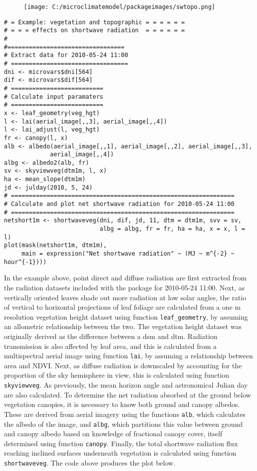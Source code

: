 \documentclass[]{article}
\begin{document}
\begin{figure}
\centering
\texttt{[image: C:/microclimatemodel/packageimages/swtopo.png]}
\caption{}
\end{figure}

\begin{verbatim}
# = Example: vegetation and topographic = = = = = = 
# = = = effects on shortwave radiation  = = = = = =
#
#=================================
# Extract data for 2010-05-24 11:00
# =================================
dni <- microvars$dni[564]
dif <- microvars$dif[564]
# ==========================
# Calculate input paramaters
# ==========================
x <- leaf_geometry(veg_hgt)
l <- lai(aerial_image[,,3], aerial_image[,,4])
l <- lai_adjust(l, veg_hgt)
fr <- canopy(l, x)
alb <- albedo(aerial_image[,,1], aerial_image[,,2], aerial_image[,,3],
             aerial_image[,,4])
albg <- albedo2(alb, fr)
sv <- skyviewveg(dtm1m, l, x)
ha <- mean_slope(dtm1m)
jd <- julday(2010, 5, 24)
# ===============================================================
# Calculate and plot net shortwave radiation for 2010-05-24 11:00
# ===============================================================
netshort1m <- shortwaveveg(dni, dif, jd, 11, dtm = dtm1m, svv = sv, 
                           albg = albg, fr = fr, ha = ha, x = x, l = l)
plot(mask(netshort1m, dtm1m), 
     main = expression("Net shortwave radiation" ~ (MJ ~ m^{-2} ~     hour^{-1})))
\end{verbatim}

In the example above, point direct and diffuse radiation are first
extracted from the radiation datasets included with the package for
2010-05-24 11:00. Next, as vertically oriented leaves shade out more
radiation at low solar angles, the ratio of vertical to horizontal
projections of leaf foliage are calculated from a one m resolution
vegetation height dataset using function \texttt{leaf\_geometry}, by
assuming an allometric relationship between the two. The vegetation
height dataset was originally derived as the difference between a dsm
and dtm. Radiation transmission is also affected by leaf area, and this
is calculated from a multispectral aerial image using function
\texttt{lai}, by assuming a relationship between area and NDVI. Next, as
diffuse radiation is downscaled by accounting for the proportion of the
sky hemisphere in view, this is calculated using function
\texttt{skyviewveg}. As previously, the mean horizon angle and
astronomical Julian day are also calculated. To determine the net
radiation absorbed at the ground below vegetation canopies, it is
necessary to know both ground and canopy albedos. These are derived from
aerial imagery using the functions \texttt{alb}, which calculates the
albedo of the image, and \texttt{albg}, which partitions this value
between ground and canopy albedo based on knowledge of fractional canopy
cover, itself determined using function \texttt{canopy}. Finally, the
total shortwave radiation flux reaching inclined surfaces underneath
vegetation is calculated using function \texttt{shortwaveveg}. The code
above produces the plot below.
\end{document}

